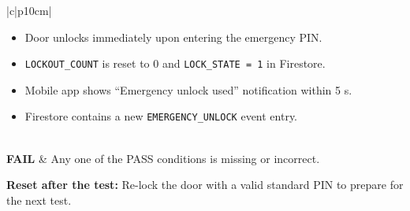 \begin{samepage}
\begin{center}
\begin{tabular}{|c|p{10cm}|}
\begin{minipage}[t]{\linewidth}
\begin{itemize}
          \item Door unlocks immediately upon entering the emergency PIN.
          \item \texttt{LOCKOUT\_COUNT} is reset to 0 and \texttt{LOCK\_STATE = 1} in Firestore.
          \item Mobile app shows “Emergency unlock used” notification within 5 s.
          \item Firestore contains a new \texttt{EMERGENCY\_UNLOCK} event entry. \\
        \end{itemize}
        \end{minipage} \\
      \hline
      \textbf{FAIL} & Any one of the PASS conditions is missing or incorrect. \\
      \hline
    \end{tabular}
    \end{center}
    
    \vspace{0.5em}
    
    \noindent\textbf{Reset after the test:}  
    Re-lock the door with a valid standard PIN to prepare for the next test.\\
    
\end{samepage}

